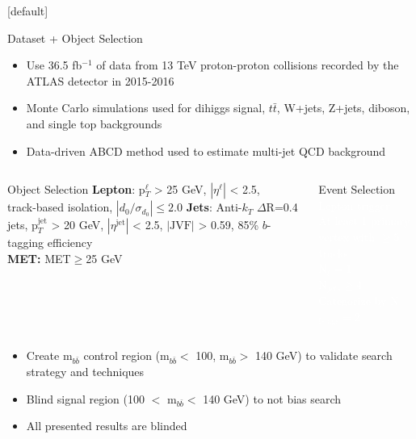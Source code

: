 \documentclass{beamer}
\newcommand*{\mbb}{\ensuremath{\text{m}_{b\bar{b}}}\xspace}
\newcommand*{\dsig}{\ensuremath{|d_{0}/\sigma_{d_{0}}|}\xspace}
\begin{document}
{  \makeatletter %
  [default]
  \def\beamer@entrycode{\vspace*{-1.075\headheight}}
  \begin{frame}{Dataset + Object Selection}
    \begin{itemize}
      \footnotesize
    \item Use 36.5 fb$^{-1}$ of data from 13 TeV proton-proton collisions recorded by the ATLAS detector in 2015-2016
    \item Monte Carlo simulations used for dihiggs signal, $t\bar{t}$, W+jets, Z+jets, diboson, and single top backgrounds
    \item Data-driven ABCD method used to estimate multi-jet QCD background
    \end{itemize}
    \begin{columns}

      \begingroup
      \small
      \begin{block}{Object Selection}
        \scriptsize
        \textbf{Lepton}: p$_{T}^{\ell}$ > 25 GeV, $|\eta^{\ell}|$ < 2.5,\\ track-based isolation, \dsig $\leq2.0$
        \textbf{Jets}: Anti-$k_{T}$ $\Delta$R=0.4 jets, p$_{T}^{\text{jet}}$ > 20 GeV, $|\eta^{\text{jet}}|$ < 2.5, $|\text{JVF}|$ > 0.59, 85\% $b$-tagging efficiency\\
        \textbf{MET:} MET$\geq$25 GeV\\
      \end{block}
      \endgroup
      \begingroup
      \small
      \begin{block}{Event Selection}
        \scriptsize
        \textcolor{white}{
          Lepton trigger\\
          At least 1 primary vertex with $\geq 5$ tracks\\
          N$_{\ell}=1$\\
          N$_{jets}\geq 4$\\
          Categorize by N$_{b\text{-tags}} =2$\\
        }
      \end{block}
      \endgroup
    \end{columns}
    \begin{itemize}\small
    \item Create \mbb control region (\mbb $<$ 100, \mbb $>$ 140 GeV) to validate search strategy and techniques
    \item Blind signal region (100 $<$ \mbb $<$ 140 GeV) to not bias search
    \item All presented results are blinded
    \end{itemize}
  \end{frame}

}
\end{document}
